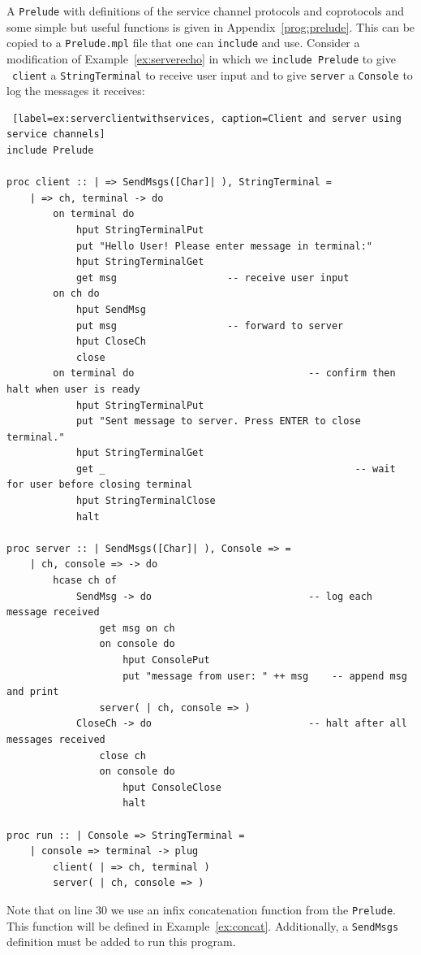 \documentclass[11pt]{article}
\begin{document}
A \lstinline{Prelude} with definitions of the service channel protocols and coprotocols and some simple but useful functions is given in Appendix~\ref{prog:prelude}.
This can be copied to a \lstinline{Prelude.mpl} file that one can \lstinline{include} and use.
Consider a modification of Example~\ref{ex:serverecho} in which we \lstinline{include Prelude} to give \ \lstinline$client$ a \lstinline$StringTerminal$ to receive user input and to give \lstinline$server$ a \lstinline$Console$ to log the messages it receives:
\begin{lstlisting} [label=ex:serverclientwithservices, caption=Client and server using service channels]  
include Prelude

proc client :: | => SendMsgs([Char]| ), StringTerminal =
    | => ch, terminal -> do
        on terminal do								
            hput StringTerminalPut
            put "Hello User! Please enter message in terminal:"
            hput StringTerminalGet
            get msg                   -- receive user input
        on ch do											
            hput SendMsg
            put msg                   -- forward to server
            hput CloseCh
            close
        on terminal do								-- confirm then halt when user is ready
            hput StringTerminalPut
            put "Sent message to server. Press ENTER to close terminal."
            hput StringTerminalGet
            get _											-- wait for user before closing terminal
            hput StringTerminalClose
            halt    
            
proc server :: | SendMsgs([Char]| ), Console => =
    | ch, console => -> do
        hcase ch of
            SendMsg -> do							-- log each message received
                get msg on ch
                on console do
                    hput ConsolePut
                    put "message from user: " ++ msg	-- append msg and print
                server( | ch, console => )
            CloseCh -> do							-- halt after all messages received
                close ch
                on console do
                    hput ConsoleClose
                    halt
                    
proc run :: | Console => StringTerminal = 
    | console => terminal -> plug
        client( | => ch, terminal )
        server( | ch, console => )
 \end{lstlisting}
Note that on line 30 we use an infix concatenation function from the \lstinline{Prelude}.
This function will be defined in Example~\ref{ex:concat}.
Additionally, a \lstinline{SendMsgs} definition must be added to run this program.
\end{document}
